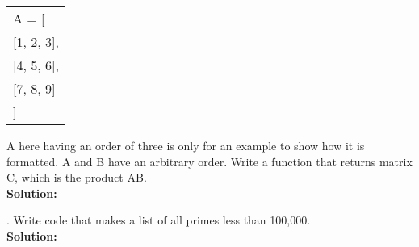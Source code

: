 \documentclass{article}
\newcommand{\icode}[1]{{\ttfamily #1}}
\newenvironment{code}{\begin{tcolorbox}\ttfamily}{\end{tcolorbox}}
\begin{document}
\begin{center} \ttfamily
	\begin{tabular}{|l}
		A = [\\
		\phantom{=   }[1, 2, 3],\\
		\phantom{=   }[4, 5, 6],\\
		\phantom{=   }[7, 8, 9]\\
		]
	\end{tabular}
\end{center}
\icode{A} here having an order of three is only for an example to show how it is formatted. \icode{A} and \icode{B} have an arbitrary order. Write a function that returns matrix \icode{C}, which is the product \icode{AB}.\\
\noindent \textbf{Solution:}
\begin{code}
	\vspace{6 in}
%

\end{code}

\newpage
{}. Write code that makes a list of all primes less than 100,000.\\
\noindent \textbf{Solution:}

\begin{code}
	\vspace{8 in}

\end{code}
\end{document}
